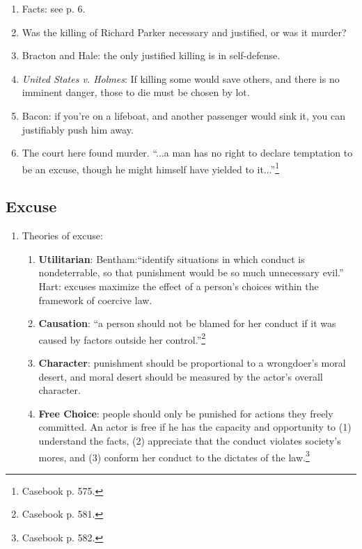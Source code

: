 \begin{enumerate}
    \item Facts: see p. 6.
    \item Was the killing of Richard Parker necessary and justified, or was it murder?
    \item Bracton and Hale: the only justified killing is in self-defense.
    \item \emph{United States v. Holmes}: If killing some would save others, and there is no imminent danger, those to die must be chosen by lot.
    \item Bacon: if you're on a lifeboat, and another passenger would sink it, you can justifiably push him away.
    \item The court here found murder. ``...a man has no right to declare temptation to be an excuse, though he might himself have yielded to it...''\footnote{Casebook p. 575.}
\end{enumerate}

\subsection{Excuse}

\begin{enumerate}
    \item Theories of excuse:
    \begin{enumerate}
        \item \textbf{Utilitarian}: Bentham:``identify situations in which conduct is nondeterrable, so that punishment would be so much unnecessary evil.'' Hart: excuses maximize the effect of a person's choices within the framework of coercive law.
        \item \textbf{Causation}: ``a person should not be blamed for her conduct if it was caused by factors outside her control.''\footnote{Casebook p. 581.}
        \item \textbf{Character}: punishment should be proportional to a wrongdoer's moral desert, and moral desert should be measured by the actor's overall character.
        \item \textbf{Free Choice}: people should only be punished for actions they freely committed. An actor is free if he has the capacity and opportunity to (1) understand the facts, (2) appreciate that the conduct violates society's mores, and (3) conform her conduct to the dictates of the law.\footnote{Casebook p. 582.}
    \end{enumerate}
\end{enumerate}

